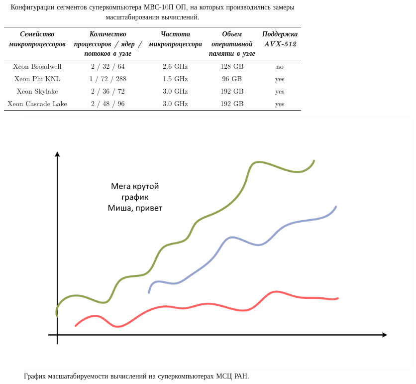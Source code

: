 \documentclass[
11pt,%
tightenlines,%
twoside,%
onecolumn,%
nofloats,%
nobibnotes,%
nofootinbib,%
superscriptaddress,%
noshowpacs,%
centertags]%
{revtex4}
\begin{document}
\begin{table}[!h]
\label{tbl:supercomputers}
\setcaptionmargin{0mm}
\onelinecaptionsfalse
{}
\caption{Конфигурации сегментов суперкомпьютера МВС-10П ОП, на которых производились замеры масштабирования вычислений.}
\bigskip
\begin{tabular}{|c|c|c|c|c|}
\hline
\parbox{3.5cm}{\textit{Семейство\\микропроцессоров}} & \parbox{4.0cm}{\textit{Количество\\процессоров / ядер /\\потоков в узле}} & \parbox{3.5cm}{\textit{Частота\\микропроцессора}} & \parbox{3.0cm}{\textit{Объем\\оперативной\\памяти в узле}} & \parbox{2.5cm}{\textit{Поддержка\\AVX-512}} \\
\hline
Xeon Broadwell & 2 / 32 / 64 & 2.6 GHz & 128 GB & no \\
\hline
Xeon Phi KNL & 1 / 72 / 288 & 1.5 GHz & 96 GB & yes \\
\hline
Xeon Skylake & 2 / 36 / 72 & 3.0 GHz & 192 GB & yes \\
\hline
Xeon Cascade Lake & 2 / 48 / 96 & 3.0 GHz & 192 GB & yes \\
\hline
\end{tabular}
\label{tab:supercomputers}
\end{table}   

\begin{figure}[h]
\includegraphics[width=1.0\textwidth]{pics/05-graph.pdf}
\caption{График масшатабируемости вычислений на суперкомпьютерах МСЦ РАН.}\label{fig:05-graph}
\end{figure}
\end{document}
